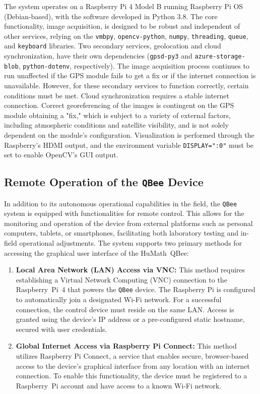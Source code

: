 The system operates on a Raspberry Pi 4 Model B running Raspberry Pi OS (Debian-based), with the software developed in Python 3.8. The core functionality, image acquisition, is designed to be robust and independent of other services, relying on the \texttt{vmbpy}, \texttt{opencv-python}, \texttt{numpy}, \texttt{threading}, \texttt{queue}, and \texttt{keyboard} libraries. Two secondary services, geolocation and cloud synchronization, have their own dependencies (\texttt{gpsd-py3} and \texttt{azure-storage-blob}, \texttt{python-dotenv}, respectively). The image acquisition process continues to run unaffected if the GPS module fails to get a fix or if the internet connection is unavailable. However, for these secondary services to function correctly, certain conditions must be met. Cloud synchronization requires a stable internet connection. Correct georeferencing of the images is contingent on the GPS module obtaining a "fix," which is subject to a variety of external factors, including atmospheric conditions and satellite visibility, and is not solely dependent on the module's configuration. Visualization is performed through the Raspberry’s HDMI output, and the environment variable \texttt{DISPLAY=":0"} must be set to enable OpenCV’s GUI output.

\subsection{Remote Operation of the \texttt{QBee} Device}

In addition to its autonomous operational capabilities in the field, the \texttt{QBee} system is equipped with functionalities for remote control. This allows for the monitoring and operation of the device from external platforms such as personal computers, tablets, or smartphones, facilitating both laboratory testing and in-field operational adjustments. The system supports two primary methods for accessing the graphical user interface of the HuMath\textregistered\ QBee:

\begin{enumerate}
    \item \textbf{Local Area Network (LAN) Access via VNC:} This method requires establishing a Virtual Network Computing (VNC) connection to the Raspberry~Pi~4 that powers the \texttt{QBee} device. The Raspberry Pi is configured to automatically join a designated Wi-Fi network. For a successful connection, the control device must reside on the same LAN. Access is granted using the device's IP address or a pre-configured static hostname, secured with user credentials.

    \item \textbf{Global Internet Access via Raspberry Pi Connect:} This method utilizes Raspberry Pi Connect, a service that enables secure, browser-based access to the device's graphical interface from any location with an internet connection. To enable this functionality, the device must be registered to a Raspberry~Pi account and have access to a known Wi-Fi network.
\end{enumerate}


